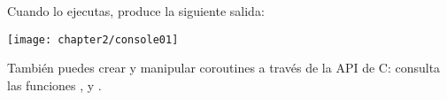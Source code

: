 \newpage

Cuando lo ejecutas, produce la siguiente salida:

\begin{center}
	\texttt{[image: chapter2/console01]} %
\end{center}

\vspace{5mm} %

También puedes crear y manipular coroutines a través de la API de C: consulta las funciones ,  y .
